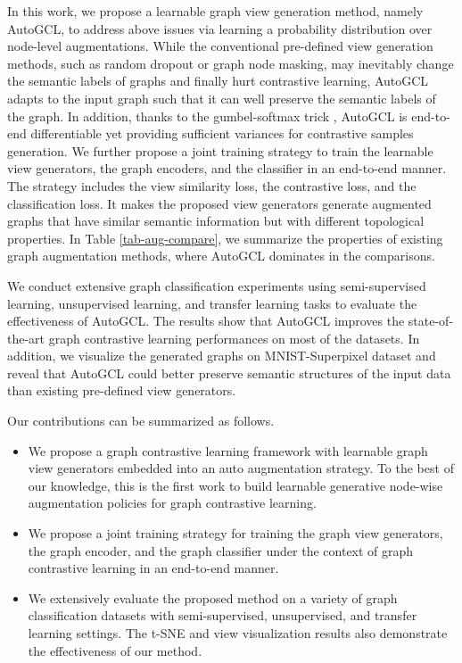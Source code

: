In this work, we propose a learnable graph view generation method, namely AutoGCL, to address above issues via learning a probability distribution over node-level augmentations. While the conventional pre-defined view generation methods, such as random dropout or graph node masking, may inevitably change the semantic labels of graphs and finally hurt contrastive learning, AutoGCL adapts to the input graph such that it can well preserve the semantic labels of the graph. In addition, thanks to the gumbel-softmax trick \cite{jang2016gumbelsoftmax}, AutoGCL is end-to-end differentiable yet providing sufficient variances for contrastive samples generation. We further propose a joint training strategy to train the learnable view generators, the graph encoders, and the classifier in an end-to-end manner. The strategy includes the view similarity loss, the contrastive loss, and the classification loss. It makes the proposed view generators generate augmented graphs that have similar semantic information but with different topological properties. In Table \ref{tab-aug-compare}, we summarize the properties of existing graph augmentation methods, where AutoGCL dominates in the comparisons.

We conduct extensive graph classification experiments using semi-supervised learning, unsupervised learning, and transfer learning tasks to evaluate the effectiveness of AutoGCL. The results show that AutoGCL improves the state-of-the-art graph contrastive learning performances on most of the datasets. In addition, we visualize the generated graphs on MNIST-Superpixel dataset \cite{monti2017mnistsuperpix} and reveal that AutoGCL could better preserve semantic structures of the input data than existing pre-defined view generators.

Our contributions can be summarized as follows.
\begin{itemize}
    \item We propose a graph contrastive learning framework with learnable graph view generators embedded into an auto augmentation strategy. To the best of our knowledge, this is the first work to build learnable generative node-wise augmentation policies for graph contrastive learning. 
    
    \item We propose a joint training strategy for training the graph view generators, the graph encoder, and the graph classifier under the context of graph contrastive learning in an end-to-end manner.
    
    \item We extensively evaluate the proposed method on a variety of graph classification datasets with semi-supervised, unsupervised, and transfer learning settings. The t-SNE and view visualization results also demonstrate the effectiveness of our method.
\end{itemize}

